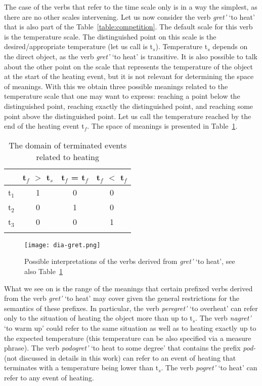 The case of the verbs that refer to the time scale only is in a way the simplest, as there are no other scales intervening. Let us now consider the verb \textit{gret'} `to heat' that is also part of the Table~\ref{table:competition}. The default scale for this verb is the temperature scale. The distinguished point on this scale is the desired/appropriate temperature (let us call is t$_s$). Temperature t$_s$ depends on the direct object, as the verb \textit{gret'} `to heat' is transitive. It is also possible to talk about the other point on the scale that represents the temperature of the object at the start of the heating event, but it is not relevant for determining the space of meanings. With this we obtain three possible meanings related to the temperature scale that one may want to express: reaching a point below the distinguished point, reaching exactly the distinguished point, and reaching some point above the distinguished point. Let us call the temperature reached by the end of the heating event t$_f$. The space of meanings is presented in Table~\ref{table:gret}.

\begin{table}
\caption{The domain of terminated events related to heating \label{table:gret}}
\begin{tabular}{lccc}
\lsptoprule
 & t$_f$ $>$ t$_s$ & t$_f$ = t$_f$ & t$_f$ $<$ t$_f$\\
\midrule
t$_1$ & 1 & 0 & 0\\
t$_2$ & 0 & 1 & 0\\
t$_3$ & 0 & 0 & 1\\
\lspbottomrule
\end{tabular}
\end{table}

\begin{figure}
\centering
\texttt{[image: dia-gret.png]}
\caption{Possible interpretations of the verbs derived from \textit{gret'} `to heat', see also Table~\ref{table:gret} \label{fig:gret}}
\end{figure}

What we see on  is the range of the meanings that certain prefixed verbs derived from the verb \textit{gret'} `to heat' may cover given the general restrictions for the semantics of these prefixes. In particular, the verb \textit{peregret'} `to overheat' can refer only to the situation of heating the object more than up to t$_s$. The verb \textit{nagret'} `to warm up' could refer to the same situation as well as to heating exactly up to the expected temperature (this temperature can be also specified via a measure phrase). The verb \textit{podogret'} `to heat to some degree' that contains the prefix \textit{pod-} (not discussed in details in this work) can refer to an event of heating that terminates with a temperature being lower than t$_s$. The verb \textit{pogret'} `to heat' can refer to any event of heating.

